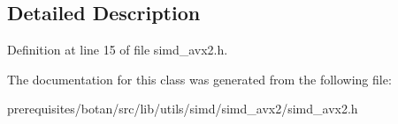 \subsection{Detailed Description}


Definition at line 15 of file simd\+\_\+avx2.\+h.



The documentation for this class was generated from the following file\+:\begin{DoxyCompactItemize}
\item 
prerequisites/botan/src/lib/utils/simd/simd\+\_\+avx2/simd\+\_\+avx2.\+h\end{DoxyCompactItemize}
